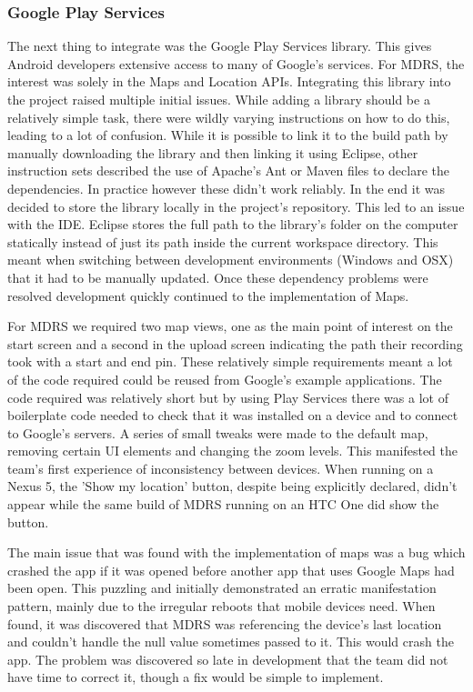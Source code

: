\documentclass{l3proj}
\begin{document}
\subsubsection{Google Play Services}    The next thing to integrate was the Google Play Services library. This gives Android developers extensive access to many of Google's services. For MDRS, the interest was solely in the Maps and Location APIs. Integrating this library into the project raised multiple initial issues. While adding a library should be a relatively simple task, there were wildly varying instructions on how to do this, leading to a lot of confusion. While it is possible to link it to the build path by manually downloading the library and then linking it using Eclipse, other instruction sets described the use of Apache's Ant or Maven files to declare the dependencies. In practice however these didn't work reliably. In the end it was decided to store the library locally in the project's repository. This led to an issue with the IDE. Eclipse stores the full path to the library's folder on the computer statically instead of just its path inside the current workspace directory. This meant when switching between development environments (Windows and OSX) that it had to be manually updated. Once these dependency problems were resolved development quickly continued to the implementation of Maps.

For MDRS we required two map views, one as the main point of interest on the start screen and a second in the upload screen indicating the path their recording took with a start and end pin. These relatively simple requirements meant a lot of the code required could be reused from Google's example applications. The code required was relatively short but by using Play Services there was a lot of boilerplate code needed to check that it was installed on a device and to connect to Google's servers. A series of small tweaks were made to the default map, removing certain UI elements and changing the zoom levels. This manifested the team's first experience of inconsistency between devices. When running on a Nexus 5, the 'Show my location' button, despite being explicitly declared, didn't appear while the same build of MDRS running on an HTC One did show the button.

The main issue that was found with the implementation of maps was a bug which crashed the app if it was opened before another app that uses Google Maps had been open. This puzzling and initially demonstrated an erratic manifestation pattern, mainly due to the irregular reboots that mobile devices need. When found, it was discovered that MDRS was referencing the device's last location and couldn't handle the null value sometimes passed to it. This would crash the app. The problem was discovered so late in development that the team did not have time to correct it, though a fix would be simple to implement.
\end{document}
